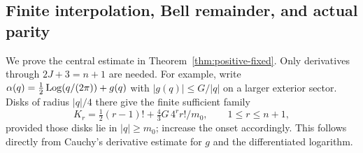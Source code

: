 \subsection{Finite interpolation, Bell remainder, and actual parity}
We prove the central estimate in Theorem~\ref{thm:positive-fixed}.
Only derivatives through $2J+3=n+1$ are needed. For example, write
$\alpha(q)=\tfrac12\operatorname{Log}(q/(2\pi))+g(q)$ with
$|g(q)|\le G/|q|$ on a larger exterior sector. Disks of radius
$|q|/4$ there give the finite sufficient family
\begin{equation}
 K_r=\tfrac12(r-1)!+\tfrac43G\,4^rr!/m_0,
 \qquad1\le r\le n+1,
 \label{eq:positive-sector-constants}
\end{equation}
provided those disks lie in $|q|\ge m_0$; increase the onset
accordingly. This follows directly from Cauchy's derivative estimate
for $g$ and the differentiated logarithm.

